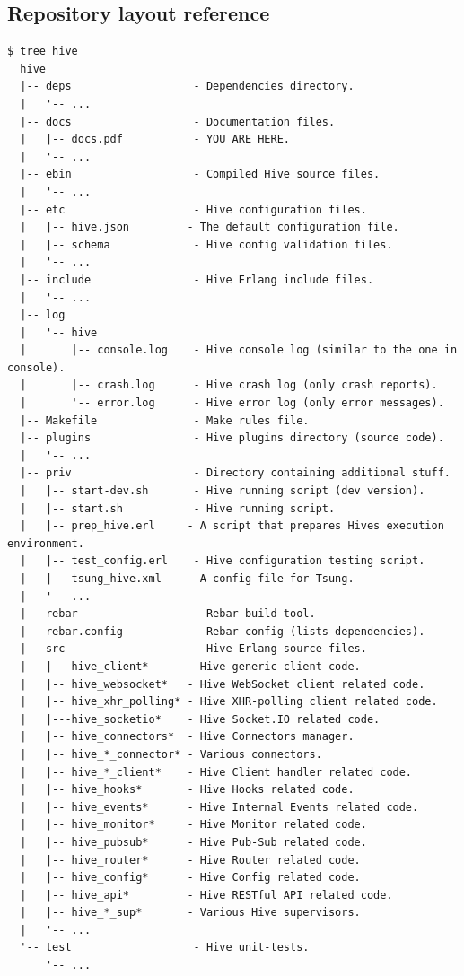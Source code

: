 \documentclass[a4paper]{article}
\begin{document}
\subsection{Repository layout reference}
\label{sec-2-5}


\begin{verbatim}
$ tree hive
  hive
  |-- deps                   - Dependencies directory.
  |   '-- ...
  |-- docs                   - Documentation files.
  |   |-- docs.pdf           - YOU ARE HERE.
  |   '-- ...
  |-- ebin                   - Compiled Hive source files.
  |   '-- ...
  |-- etc                    - Hive configuration files.
  |   |-- hive.json         - The default configuration file.
  |   |-- schema             - Hive config validation files.
  |   '-- ...
  |-- include                - Hive Erlang include files.
  |   '-- ...
  |-- log
  |   '-- hive
  |       |-- console.log    - Hive console log (similar to the one in console).
  |       |-- crash.log      - Hive crash log (only crash reports).
  |       '-- error.log      - Hive error log (only error messages).
  |-- Makefile               - Make rules file.
  |-- plugins                - Hive plugins directory (source code).
  |   '-- ...
  |-- priv                   - Directory containing additional stuff.
  |   |-- start-dev.sh       - Hive running script (dev version).
  |   |-- start.sh           - Hive running script.
  |   |-- prep_hive.erl     - A script that prepares Hives execution environment.
  |   |-- test_config.erl    - Hive configuration testing script.
  |   |-- tsung_hive.xml    - A config file for Tsung.
  |   '-- ...
  |-- rebar                  - Rebar build tool.
  |-- rebar.config           - Rebar config (lists dependencies).
  |-- src                    - Hive Erlang source files.
  |   |-- hive_client*      - Hive generic client code.
  |   |-- hive_websocket*   - Hive WebSocket client related code.
  |   |-- hive_xhr_polling* - Hive XHR-polling client related code.
  |   |---hive_socketio*    - Hive Socket.IO related code.
  |   |-- hive_connectors*  - Hive Connectors manager.
  |   |-- hive_*_connector* - Various connectors.
  |   |-- hive_*_client*    - Hive Client handler related code.
  |   |-- hive_hooks*       - Hive Hooks related code.
  |   |-- hive_events*      - Hive Internal Events related code.
  |   |-- hive_monitor*     - Hive Monitor related code.
  |   |-- hive_pubsub*      - Hive Pub-Sub related code.
  |   |-- hive_router*      - Hive Router related code.
  |   |-- hive_config*      - Hive Config related code.
  |   |-- hive_api*         - Hive RESTful API related code.
  |   |-- hive_*_sup*       - Various Hive supervisors.
  |   '-- ...
  '-- test                   - Hive unit-tests.
      '-- ...
\end{verbatim}
\end{document}
